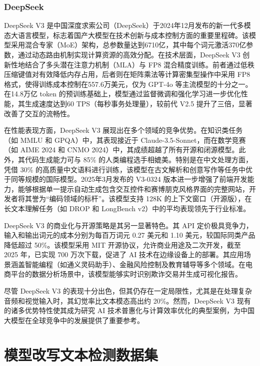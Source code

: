 \subsubsection{DeepSeek}
\label{sec:TOSWT-gen-ds}

DeepSeek V3 \cite{deepseekai2024deepseekv3technicalreport} 是中国深度求索公司（DeepSeek）于2024年12月发布的新一代多模态大语言模型，标志着国产大模型在技术创新与成本控制方面的重要里程碑。该模型采用混合专家（MoE）架构，总参数量达到6710亿，其中每个词元激活370亿参数，通过动态路由机制实现计算资源的高效分配。在技术层面，DeepSeek V3 创新性地结合了多头潜在注意力机制（MLA）与 FP8 混合精度训练。前者通过低秩压缩键值对有效降低内存占用，后者则在矩阵乘法等计算密集型操作中采用 FP8 格式，使得训练成本控制在557.6万美元，仅为 GPT-4o 等主流模型的十分之一。在14.8万亿 token 的预训练基础上，模型通过监督微调和强化学习进一步优化性能，其生成速度达到60 TPS（每秒事务处理量），较前代 V2.5 提升了三倍，显著改善了交互的流畅性。

在性能表现方面，DeepSeek V3 展现出在多个领域的竞争优势。在知识类任务（如 MMLU 和 GPQA）中，其表现接近于 Claude-3.5-Sonnet，而在数学竞赛（如 AIME 2024 和 CNMO 2024）中，其成绩超越了所有开源和闭源模型。此外，其代码生成能力可与 85\% 的人类编程选手相媲美。特别是在中文处理方面，凭借 30\% 的高质量中文语料进行训练，该模型在古文解析和创意写作等任务中优于同等规模的国际模型。2025年3月发布的 V3-0324 版本进一步增强了前端开发能力，能够根据单一提示自动生成包含交互控件和赛博朋克风格界面的完整网站，开发者将其誉为“编码领域的标杆”。该模型支持 128K 的上下文窗口（开源版），在长文本理解任务（如 DROP 和 LongBench v2）中的平均表现领先于行业标准。

DeepSeek V3 的商业化与开源策略是其另一显著特色。其 API 定价极具竞争力，输入和输出词元的成本分别为每百万词元 0.27 美元和 1.10 美元，较国际同类产品降低超过 50\%。该模型采用 MIT 开源协议，允许商业用途及二次开发，截至 2025 年，已实现 700 万次下载，促进了 AI 技术在边缘设备上的部署。其应用场景涵盖智能编程（如通义灵码助手）、金融风险控制及教育辅导等多个领域。在电商平台的数据分析场景中，该模型能够实时识别欺诈交易并生成可视化报告。

尽管 DeepSeek V3 的表现十分出色，但其仍存在一定局限性，尤其是在处理复杂音频和视觉输入时，其幻觉率比文本模态高出约 20\%。然而，DeepSeek V3 现有的诸多优势特性使其成为研究 AI 技术普惠化与计算效率优化的典型案例，为中国大模型在全球竞争中的发展提供了重要参考。

\section{模型改写文本检测数据集}
\label{sec:TOSWT-info}

